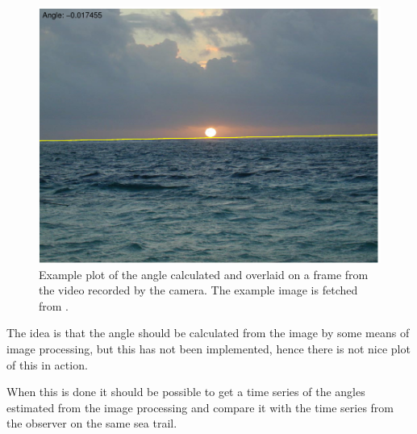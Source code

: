 \begin{figure}[htbp]
\centering
\includegraphics[width=\textwidth]{pdf/horizon}
\caption{Example plot of the angle calculated and overlaid on a frame
from the video recorded by the camera. The example image is fetched
from \citep{horizon-img}.}
\end{figure}

The idea is that the angle should be calculated from the image by some
means of image processing, but this has not been implemented, hence
there is not nice plot of this in action. 

When this is done it should be possible to get a time series of the
angles estimated from the image processing and compare it with the
time series from the observer on the same sea trail.
